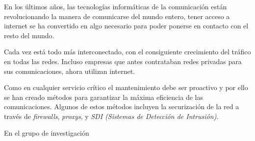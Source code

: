 
En los últimos años, las tecnologías informáticas de la comunicación están revolucionando la manera de comunicarse del mundo entero, tener acceso a internet se ha convertido en algo necesario para poder ponerse en contacto con el resto del mundo.

Cada vez está todo más interconectado, con el consiguiente crecimiento del tráfico en todas las redes. Incluso empresas que antes contrataban redes privadas para sus comunicaciones, ahora utilizan internet.

Como en cualquier servicio crítico el mantenimiento debe ser proactivo y por ello se han creado métodos para garantizar la máxima eficiencia de las comunicaciones. Algunos de estos métodos incluyen la securización de la red a través de \textit{firewalls}, \textit{proxys}, y \textit{SDI (Sistemas de Detección de Intrusión)}.

En el grupo de investigación